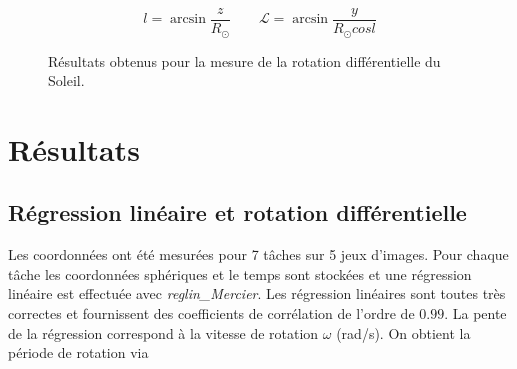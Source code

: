 \documentclass[a4paper,11pt]{article}
\numberwithin{equation}{section}
\begin{document}
\begin{equation}
  \label{eq:coord}
  l = \arcsin \frac{z}{R_{\odot}} \qquad \mathscr{L} = \arcsin \frac{y}{R_{\odot} cos l}
\end{equation}

\begin{figure}[H]
  \centering
 
  \caption{Résultats obtenus pour la mesure de la rotation différentielle du Soleil.}
  \label{fig:graphe}
\end{figure}

\section{Résultats}
\subsection{Régression linéaire et rotation différentielle}
Les coordonnées ont été mesurées pour 7 tâches sur 5 jeux d'images. Pour chaque tâche les coordonnées sphériques et le temps sont stockées et une régression linéaire est effectuée avec \textit{reglin\_Mercier}. Les régression linéaires sont toutes très correctes et fournissent des coefficients de corrélation de l'ordre de $0.99$.
La pente de la régression correspond à la vitesse de rotation $\omega$ (rad/s). On obtient la période de rotation via 
\end{document}
